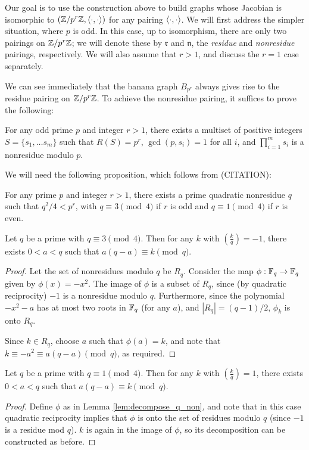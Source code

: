 \documentclass{amsart}
\begin{document}
Our goal is to use the construction above to build graphs whose
Jacobian is isomorphic to $(\mathbb{Z}/p^r\mathbb{Z}, \langle \cdot, \cdot \rangle)$ for any
pairing $\langle \cdot, \cdot \rangle$. We will first address the simpler
situation, where $p$ is odd. In this case, up to isomorphism, there
are only two pairings on $\mathbb{Z}/p^r\mathbb{Z}$; we will denote these by
$\mathfrak{r}$ and $\mathfrak{n}$, the \emph{residue} and
\emph{nonresidue} pairings, respectively. We will also assume that $r
> 1$, and discuss the $r=1$ case separately. 

We can see immediately that the banana graph $B_{p^r}$ always gives
rise to the residue pairing on $\mathbb{Z}/p^r\mathbb{Z}$. To achieve the nonresidue
pairing, it suffices to prove the following:

\begin{claim}
  \label{claim:exist_decomp}
  For any odd prime $p$ and integer $r > 1$, there exists a
  multiset of positive integers $S = \{s_1, \ldots s_m\}$ such that
  $R(S) = p^r$, $\gcd(p, s_i) = 1$ for all $i$, and $\prod_{i=1}^ms_i$
  is a nonresidue modulo $p$.
\end{claim}

We will need the following proposition, which follows from (CITATION):
\begin{prop}
  \label{prop:q_bound}
  For any prime $p$ and integer $r > 1$, there exists a prime
  quadratic nonresidue $q$ such that $q^2/4<p^r$, with $q\equiv 3\pmod
  4$ if $r$ is odd and $q\equiv 1\pmod 4$ if $r$ is even.
\end{prop}

\begin{lem}
  \label{lem:decompose_q_non}
  Let $q$ be a prime with $q \equiv 3 \pmod 4$. Then for any $k$
  with $\left( \frac{k}{q} \right) = -1$, there exists $0 < a < q$
  such that $a(q-a) \equiv k \pmod q$. 
\end{lem}
\begin{proof}
  Let the set of nonresidues modulo $q$ be $R_q$. Consider the map
  $\phi:\mathbb{F}_q \to \mathbb{F}_q$ given by $\phi(x) = -x^2$. The image of
  $\phi$ is a subset of $R_q$, since (by quadratic reciprocity)
  $-1$ is a nonresidue modulo $q$. Furthermore, since the polynomial
  $-x^2 - a$ has at most two roots in $\mathbb{F}_q$ (for any $a$), and
  $|R_q| = (q - 1)/2$, $\phi_k$ is onto $R_q$. 

  Since $k \in R_q$, choose $a$ such that $\phi(a) = k$, and note
  that $k \equiv -a^2 \equiv a(q-a) \pmod q$, as required.
\end{proof}
\begin{lem}
  \label{lem:decompose_q_res}
  Let $q$ be a prime with $q \equiv 1 \pmod 4$. Then for any $k$
  with $\left( \frac{k}{q} \right) = 1$, there exists $0 < a < q$
  such that $a(q-a) \equiv k \pmod q$.
\end{lem}
\begin{proof}
  Define $\phi$ as in Lemma \ref{lem:decompose_q_non}, and note that in
  this case quadratic reciprocity implies that $\phi$ is onto the set
  of residues modulo $q$ (since $-1$ is a residue mod $q$). $k$ is
  again in the image of $\phi$, so its decomposition can be
  constructed as before.
\end{proof}
\end{document}
